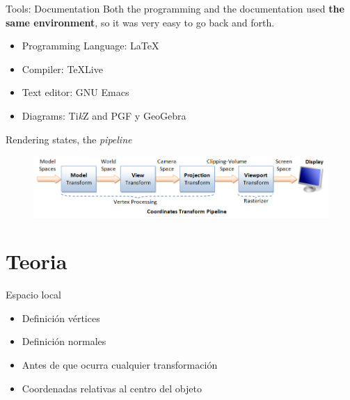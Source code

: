 \documentclass{beamer}
\begin{document}
\begin{frame}{Tools: Documentation}
  Both the programming and the documentation used \textbf{the same environment}, so it was very easy to go back and forth.
  \begin{itemize}
  \item{Programming Language: \textrm{\LaTeX}}
  \item{Compiler: \textrm{\TeX  Live}}
  \item{Text editor: GNU Emacs}
  \item{Diagrams: Ti\textit{k}Z and PGF y GeoGebra}
  \end{itemize}
\end{frame}


\begin{frame}{Rendering states, the \textit{pipeline}}
  \begin{figure}
    \centering
    \includegraphics[width=\textwidth]{img/pipeline}
    \end{figure}
\end{frame}

\section{Teoria}
\begin{frame}{Espacio local}
  \begin{itemize}
  \item{Definición vértices}
  \item{Definición normales}
  \item{Antes de que ocurra cualquier transformación}
  \item{Coordenadas relativas al centro del objeto}
  \end{itemize}

  \begin{figure} [h!]
    \centering
  \end{figure}
  
\end{frame}
\end{document}

